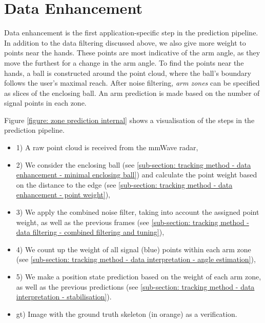 \section{Data Enhancement}
\label{section: tracking method - data enhancement}

Data enhancement is the first application-specific step in the prediction pipeline.
In addition to the data filtering discussed above, we also give more weight to points near the hands.
These points are most indicative of the arm angle, as they move the furthest for a change in the arm angle.
To find the points near the hands, a ball is constructed around the point cloud, where the ball's boundary follows the user's maximal reach.
After noise filtering, \textit{arm zones} can be specified as slices of the enclosing ball.
An arm prediction is made based on the number of signal points in each zone.

Figure \ref{figure: zone prediction internal} shows a visualisation of the steps in the prediction pipeline.
\begin{itemize}[nolistsep]
    \item 1)  A raw point cloud is received from the mmWave radar, 
    \item 2)  We consider the enclosing ball (see \cref{sub-section: tracking method - data enhancement - minimal enclosing ball}) and calculate the point weight based on the distance to the edge (see \cref{sub-section: tracking method - data enhancement - point weight}), 
    \item 3)  We apply the combined noise filter, taking into account the assigned point weight, as well as the previous frames (see \cref{sub-section: tracking method - data filtering - combined filtering and tuning}), 
    \item 4)  We count up the weight of all signal (blue) points within each arm zone (see \cref{sub-section: tracking method - data interpretation - angle estimation}), 
    \item 5)  We make a position state prediction based on the weight of each arm zone, as well as the previous predictions (see \cref{sub-section: tracking method - data interpretation - stabilisation}). 
    \item gt) Image with the ground truth skeleton (in orange) as a verification.
\end{itemize}

